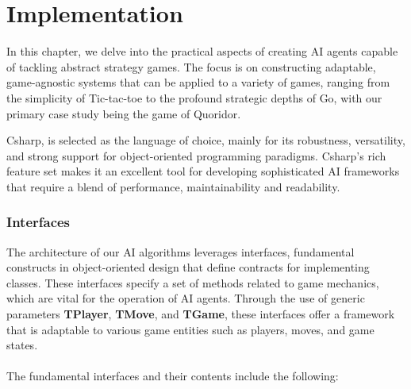 \chapter{Implementation}

In this chapter, we delve into the practical aspects of creating \ac{AI} agents capable of tackling abstract strategy games. The focus is on constructing adaptable, game-agnostic systems that can be applied to a variety of games, ranging from the simplicity of Tic-tac-toe to the profound strategic depths of Go, with our primary case study being the game of Quoridor.

\ac{Csharp}, is selected as the language of choice, mainly for its robustness, versatility, and strong support for object-oriented programming paradigms. \ac{Csharp}'s rich feature set makes it an excellent tool for developing sophisticated \ac{AI} frameworks that require a blend of performance, maintainability and readability.

\subsection{Interfaces}

The architecture of our \ac{AI} algorithms leverages interfaces, fundamental constructs in object-oriented design that define contracts for implementing classes. These interfaces specify a set of methods related to game mechanics, which are vital for the operation of \ac{AI} agents. Through the use of generic parameters \textbf{TPlayer}, \textbf{TMove}, and \textbf{TGame}, these interfaces offer a framework that is adaptable to various game entities such as players, moves, and game states. \\ \\
The fundamental interfaces and their contents include the following:

